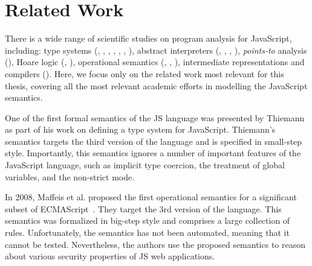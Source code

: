 \documentclass[runningheads]{llncs}
\begin{document}
\section{Related Work}
\label{sec:Related Work}

There is a wide range of scientific studies on program analysis for JavaScript, including: type systems (\cite{Type_Analysis_for_JavaScript}, \cite{Towards_Type_Inference_for_JavaScript}, \cite{Understanding_TypeScript},  \cite{Fast_and_precise_hybrid_type_inference_for_JavaScript}, \cite{Depedent_Types_for_JavaScript}, \cite{Safe_&_Efficient_Gradual_Typing_for_TypeScript},  \cite{Type_Inference_for_Static_Compilation_of_JavaScript}), abstract interpreters (\cite{SAFE:Formal_Specification_and_Implementation_of_a_Scalable_Analysis_Framework_for_ECMAScript}, \cite{JSAI:a_static_analysis_platform_for_JavaScript}, \cite{Scalable_and_Precise_Static_Analysis_of_JavaScript_Applications_via_Loop-Sensitivity},  \cite{Combining_string_abstract_domains_for_JavaScript_analysis:an_evaluation)}), \emph{points-to} analysis (\cite{Points-to_analysis_for_JavaScript}), Hoare logic (\cite{Javert-2017}, \cite{Javert-2019}), operational semantics (\cite{JSCert-2014}, \cite{KJS-2015}, \cite{JSExplain-2018}), intermediate representations and compilers (\cite{Dynamic_property_caches:a_step_towards_faster_JavaScript_proxy_objects}). Here, we focus only on the related work most relevant for this thesis, covering all the most relevant academic efforts in modelling the JavaScript semantics.

One of the first formal semantics of the JS language was presented by Thiemann~\cite{Thiemann-2005} as part of his work on defining a type system for JavaScript. Thiemann's semantics targets the third version of the language and is specified in small-step style. Importantly, this semantics ignores a number of important features of the JavaScript language, such as implicit type coercion, the treatment of global variables, and the non-strict mode.

In 2008, Maffeis et al. proposed the first operational semantics for a significant subset of ECMAScript~\cite{operational_semantics_javascript-2008}. They target the 3rd version of the language. This semantics was formalized in big-step style and comprises a large collection of rules. Unfortunately, the semantics has not been automated, meaning that it cannot be tested. Nevertheless, the authors use the proposed semantics to reason about various security properties of JS web applications.
\end{document}
